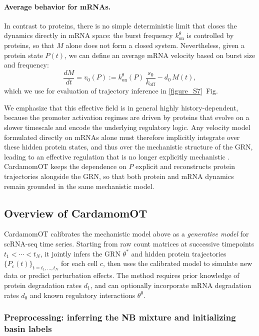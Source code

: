 \documentclass[a4paper, 11pt]{article}
\theoremstyle{plain}
\theoremstyle{remark}
\begin{document}
\paragraph{Average behavior for mRNAs.}
In contrast to proteins, there is no simple deterministic limit that closes the dynamics directly in mRNA space: the burst frequency $k^{\theta}_{\mathrm{on}}$ is controlled by proteins, so that $M$ alone does not form a closed system. Nevertheless, given a protein state \(P(t)\), we can define an average mRNA velocity based on burst size and frequency:
\begin{equation}
\label{eq:velocity_rna}
\frac{dM}{dt}
= v_0(P)
:= k^{\theta}_{\mathrm{on}}(P)\,\frac{s_0}{k_{\mathrm{off}}}
- d_0\,M(t),
\end{equation}
which we use for evaluation of trajectory inference in \ref{figure_S7}~Fig.

We emphasize that this effective field is in general highly history-dependent, because the promoter activation regimes are driven by proteins that evolve on a slower timescale and encode the underlying regulatory logic. Any velocity model formulated directly on mRNAs alone must therefore implicitly integrate over these hidden protein states, and thus over the mechanistic structure of the GRN, leading to an effective regulation that is no longer explicitly mechanistic \cite{bertin2025scalable}. CardamomOT keeps the dependence on $P$ explicit and reconstructs protein trajectories alongside the GRN, so that both protein and mRNA dynamics remain grounded in the same mechanistic model.


\subsection{Overview of CardamomOT}
\label{subsec:overview}

CardamomOT calibrates the mechanistic model above as a \emph{generative model} for scRNA-seq time series. Starting from raw count matrices at successive timepoints $t_1 < \cdots < t_N$, it jointly infers the GRN $\theta^*$ and hidden protein trajectories $\{P_c(t)\}_{t=t_1,\dots,t_N}$ for each cell $c$, then uses the calibrated model to simulate new data or predict perturbation effects. The method requires prior knowledge of protein degradation rates $d_1$, and can optionally incorporate mRNA degradation rates $d_0$ and known regulatory interactions $\theta^0$.

\subsubsection{Preprocessing: inferring the NB mixture and initializing basin labels}
\label{subsec:Mixture_inference}
\end{document}
